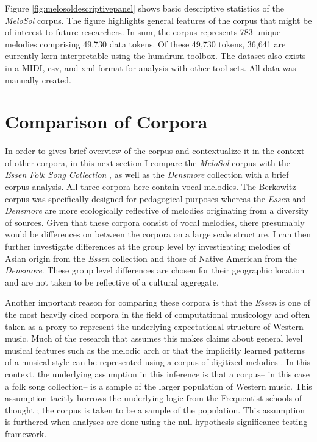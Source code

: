 \documentclass[]{book}
\begin{document}
Figure \ref{fig:melosoldescriptivepanel} shows basic descriptive statistics of the \emph{MeloSol} corpus.
The figure highlights general features of the corpus that might be of interest to future researchers.
In sum, the corpus represents 783 unique melodies comprising 49,730 data tokens.
Of these 49,730 tokens, 36,641 are currently kern interpretable using the humdrum toolbox.
The dataset also exists in a MIDI, csv, and xml format for analysis with other tool sets.
All data was manually created.

\hypertarget{comparison-of-corpora}{%
\section{Comparison of Corpora}\label{comparison-of-corpora}}

In order to gives brief overview of the corpus and contextualize it in the context of other corpora, in this next section I compare the \emph{MeloSol} corpus with the \emph{Essen Folk Song Collection} \citep{schaffrathEssenFolkSong1995}, as well as the \emph{Densmore} collection \citep{shanahanDENSMORECOLLECTIONNATIVE2014} with a brief corpus analysis.
All three corpora here contain vocal melodies.
The Berkowitz corpus was specifically designed for pedagogical purposes whereas the \emph{Essen} and \emph{Densmore} are more ecologically reflective of melodies originating from a diversity of sources.
Given that these corpora consist of vocal melodies, there presumably would be differences on between the corpora on a large scale structure.
I can then further investigate differences at the group level by investigating melodies of Asian origin from the \emph{Essen} collection and those of Native American from the \emph{Densmore}.
These group level differences are chosen for their geographic location and are not taken to be reflective of a cultural aggregate.

Another important reason for comparing these corpora is that the \emph{Essen} is one of the most heavily cited corpora in the field of computational musicology and often taken as a proxy to represent the underlying expectational structure of Western music.
Much of the research that assumes this makes claims about general level musical features such as the melodic arch \citep{huronMelodicArchWestern1996, shanahanExaminingEffectOral2019} or that the implicitly learned patterns of a musical style can be represented using a corpus of digitized melodies \citep{demorestQuantifyingCulture2015, pearceStatisticalLearningProbabilistic2018a}.
In this context, the underlying assumption in this inference is that a corpus-- in this case a folk song collection-- is a sample of the larger population of Western music.
This assumption tacitly borrows the underlying logic from the Frequentist schools of thought \citep{dienesUnderstandingPsychologyScience2008}; the corpus is taken to be a sample of the population.
This assumption is furthered when analyses are done using the null hypothesis significance testing framework.
\end{document}
